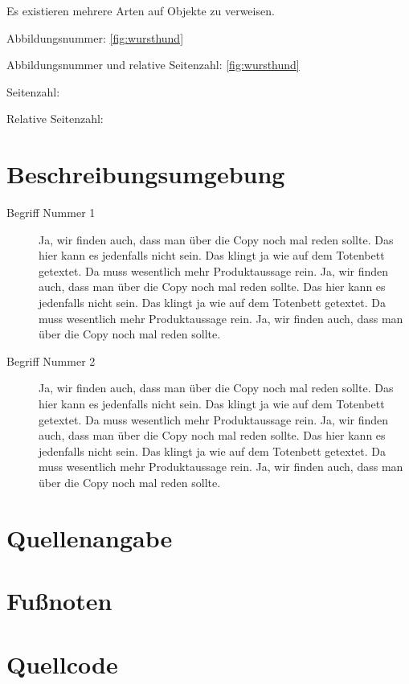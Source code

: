 Es existieren mehrere Arten auf Objekte zu verweisen.

Abbildungsnummer: \ref{fig:wursthund}

Abbildungsnummer und relative Seitenzahl: \vref{fig:wursthund}

Seitenzahl: \pageref{fig:wursthund}

Relative Seitenzahl: 

\section{Beschreibungsumgebung}

\begin{description}
\item[Begriff Nummer 1] Ja, wir finden auch, dass man über die Copy noch mal reden sollte. Das hier kann es jedenfalls nicht sein. Das klingt ja wie auf dem Totenbett getextet. Da muss wesentlich mehr Produktaussage rein. Ja, wir finden auch, dass man über die Copy noch mal reden sollte. Das hier kann es jedenfalls nicht sein. Das klingt ja wie auf dem Totenbett getextet. Da muss wesentlich mehr Produktaussage rein. Ja, wir finden auch, dass man über die Copy noch mal reden sollte.
\item[Begriff Nummer 2] Ja, wir finden auch, dass man über die Copy noch mal reden sollte. Das hier kann es jedenfalls nicht sein. Das klingt ja wie auf dem Totenbett getextet. Da muss wesentlich mehr Produktaussage rein. Ja, wir finden auch, dass man über die Copy noch mal reden sollte. Das hier kann es jedenfalls nicht sein. Das klingt ja wie auf dem Totenbett getextet. Da muss wesentlich mehr Produktaussage rein. Ja, wir finden auch, dass man über die Copy noch mal reden sollte.
\end{description}

\section{Quellenangabe}

\section{Fußnoten}

\section{Quellcode}